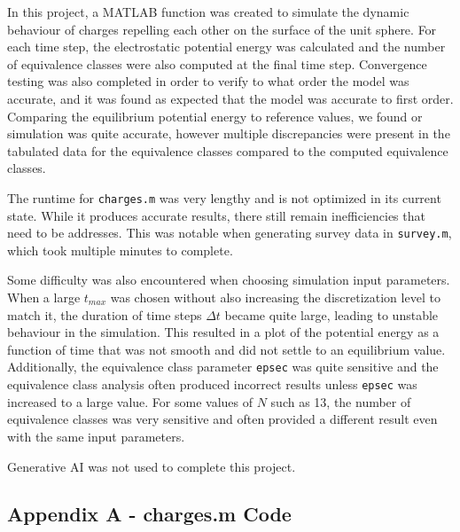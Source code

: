 \documentclass[10pt]{article}
\def\code#1{\texttt{#1}} %
\begin{document}
In this project, a MATLAB function was created to simulate the dynamic behaviour of charges repelling 
each other on the surface of the unit sphere. For each time step, the electrostatic potential energy
was calculated and the number of equivalence classes were also computed at the final time step. 
Convergence testing was also completed in order to verify to what order the model was accurate, and it 
was found as expected that the model was accurate to first order. Comparing the equilibrium potential 
energy to reference values, we found or simulation was quite accurate, however multiple discrepancies 
were present in the tabulated data for the equivalence classes compared to the computed equivalence 
classes. 

The runtime for \code{charges.m} was very lengthy and is not optimized in its current state. While it 
produces accurate results, there still remain inefficiencies that need to be addresses. This was 
notable when generating survey data in \code{survey.m}, which took multiple minutes to complete.

Some difficulty was also encountered when choosing simulation input parameters. When a large $t_{max}$
was chosen without also increasing the discretization level to match it, the duration of time steps 
$\Delta t$ became quite large, leading to unstable behaviour in the simulation. This resulted in a 
plot of the potential energy as a function of time that was not smooth and did not settle to an 
equilibrium value. Additionally, the equivalence class parameter \code{epsec} was quite sensitive
and the equivalence class analysis often produced incorrect results unless \code{epsec} was increased 
to a large value. For some values of $N$ such as 13, the number of equivalence classes was very 
sensitive and often provided a different result even with the same input parameters.

Generative AI was not used to complete this project. 

\pagebreak

\subsection*{Appendix A - charges.m Code}


\pagebreak
\end{document}
